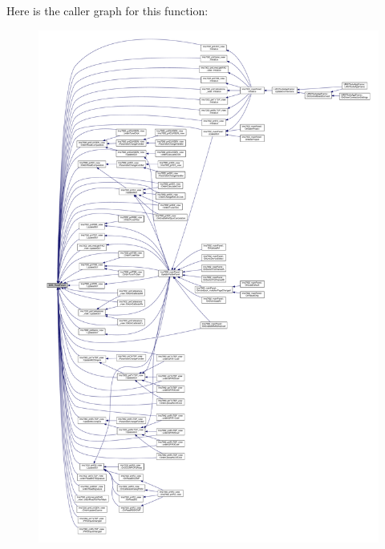 Here is the caller graph for this function\+:
\nopagebreak
\begin{figure}[H]
\begin{center}
\leavevmode
\includegraphics[width=350pt]{df/de1/lms7__api_8cpp_af7e27adc91d37b2464a10990b1f39c9b_icgraph}
\end{center}
\end{figure}


